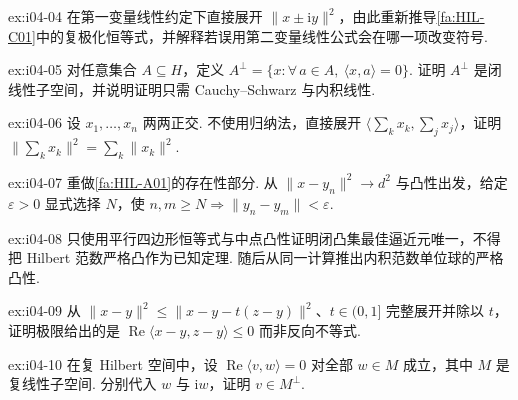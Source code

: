 \begin{FAExercise}[复极化恒等式符号核验]{ex:i04-04}
在第一变量线性约定下直接展开 \(\displaystyle \|x\pm\mathrm{i}y\|^2\)，由此重新推导\autoref{fa:HIL-C01}中的复极化恒等式，并解释若误用第二变量线性公式会在哪一项改变符号.
\end{FAExercise}

\begin{FAExercise}[正交补的闭性]{ex:i04-05}
对任意集合 \(\displaystyle A\subseteq H\)，定义 \(\displaystyle A^\perp=\{x:\forall\,a\in A,\ \langle x,a\rangle=0\}\). 证明 \(\displaystyle A^\perp\) 是闭线性子空间，并说明证明只需 Cauchy--Schwarz 与内积线性.
\end{FAExercise}

\begin{FAExercise}[有限正交和恒等式]{ex:i04-06}
设 \(\displaystyle x_1,\dots,x_n\) 两两正交. 不使用归纳法，直接展开 \(\displaystyle \langle\sum_kx_k,\sum_jx_j\rangle\)，证明 \(\displaystyle \|\sum_kx_k\|^2=\sum_k\|x_k\|^2\).
\end{FAExercise}

\begin{FAExercise}[闭凸投影的存在性估计]{ex:i04-07}
重做\autoref{fa:HIL-A01}的存在性部分. 从 \(\displaystyle \|x-y_n\|^2\to d^2\) 与凸性出发，给定 \(\displaystyle \varepsilon>0\) 显式选择 \(\displaystyle N\)，使 \(\displaystyle n,m\geqslant N\Rightarrow\|y_n-y_m\|<\varepsilon\).
\end{FAExercise}

\begin{FAExercise}[投影唯一性与严格凸性]{ex:i04-08}
只使用平行四边形恒等式与中点凸性证明闭凸集最佳逼近元唯一，不得把 Hilbert 范数严格凸作为已知定理. 随后从同一计算推出内积范数单位球的严格凸性.
\end{FAExercise}

\begin{FAExercise}[变分不等式方向]{ex:i04-09}
从 \(\displaystyle \|x-y\|^2\leqslant\|x-y-t(z-y)\|^2\)、\(\displaystyle t\in(0,1]\) 完整展开并除以 \(\displaystyle t\)，证明极限给出的是 \(\displaystyle \operatorname{Re}\langle x-y,z-y\rangle\leqslant0\) 而非反向不等式.
\end{FAExercise}

\begin{FAExercise}[复闭子空间的正交条件]{ex:i04-10}
在复 Hilbert 空间中，设 \(\displaystyle \operatorname{Re}\langle v,w\rangle=0\) 对全部 \(\displaystyle w\in M\) 成立，其中 \(\displaystyle M\) 是复线性子空间. 分别代入 \(\displaystyle w\) 与 \(\displaystyle \mathrm{i}w\)，证明 \(\displaystyle v\in M^\perp\).
\end{FAExercise}

